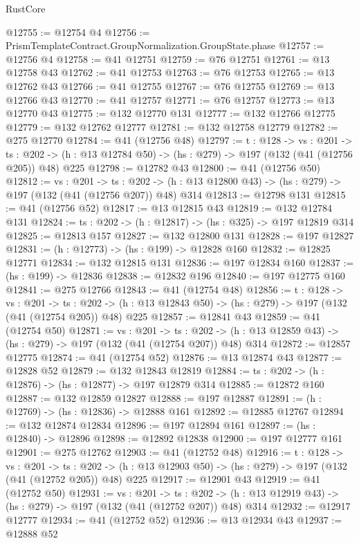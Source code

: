 \begin{lexlean}{RustCore}
\begin{coremodule}
@12755 := @12754 @4
@12756 := PrismTemplateContract.GroupNormalization.GroupState.phase
@12757 := @12756 @4
@12758 := @41 @12751
@12759 := @76 @12751
@12761 := @13 @12758 @43
@12762 := @41 @12753
@12763 := @76 @12753
@12765 := @13 @12762 @43
@12766 := @41 @12755
@12767 := @76 @12755
@12769 := @13 @12766 @43
@12770 := @41 @12757
@12771 := @76 @12757
@12773 := @13 @12770 @43
@12775 := @132 @12770 @131
@12777 := @132 @12766 @12775
@12779 := @132 @12762 @12777
@12781 := @132 @12758 @12779
@12782 := @275 @12770
@12784 := @41 (@12756 @48)
@12797 := {t : @128} ->
  {vs : @201} ->
  {ts : @202} -> (h : @13 @12784 @50) -> (hs : @279) -> @197 (@132 (@41 (@12756 @205)) @48) @225
@12798 := @12782 @43
@12800 := @41 (@12756 @50)
@12812 := {vs : @201} ->
  {ts : @202} -> (h : @13 @12800 @43) -> (hs : @279) -> @197 (@132 (@41 (@12756 @207)) @48) @314
@12813 := @12798 @131
@12815 := @41 (@12756 @52)
@12817 := @13 @12815 @43
@12819 := @132 @12784 @131
@12824 := {ts : @202} -> (h : @12817) -> (hs : @325) -> @197 @12819 @314
@12825 := @12813 @157
@12827 := @132 @12800 @131
@12828 := @197 @12827
@12831 := (h : @12773) -> (hs : @199) -> @12828 @160
@12832 := @12825 @12771
@12834 := @132 @12815 @131
@12836 := @197 @12834 @160
@12837 := (hs : @199) -> @12836
@12838 := @12832 @196
@12840 := @197 @12775 @160
@12841 := @275 @12766
@12843 := @41 (@12754 @48)
@12856 := {t : @128} ->
  {vs : @201} ->
  {ts : @202} -> (h : @13 @12843 @50) -> (hs : @279) -> @197 (@132 (@41 (@12754 @205)) @48) @225
@12857 := @12841 @43
@12859 := @41 (@12754 @50)
@12871 := {vs : @201} ->
  {ts : @202} -> (h : @13 @12859 @43) -> (hs : @279) -> @197 (@132 (@41 (@12754 @207)) @48) @314
@12872 := @12857 @12775
@12874 := @41 (@12754 @52)
@12876 := @13 @12874 @43
@12877 := @12828 @52
@12879 := @132 @12843 @12819
@12884 := {ts : @202} -> (h : @12876) -> (hs : @12877) -> @197 @12879 @314
@12885 := @12872 @160
@12887 := @132 @12859 @12827
@12888 := @197 @12887
@12891 := (h : @12769) -> (hs : @12836) -> @12888 @161
@12892 := @12885 @12767
@12894 := @132 @12874 @12834
@12896 := @197 @12894 @161
@12897 := (hs : @12840) -> @12896
@12898 := @12892 @12838
@12900 := @197 @12777 @161
@12901 := @275 @12762
@12903 := @41 (@12752 @48)
@12916 := {t : @128} ->
  {vs : @201} ->
  {ts : @202} -> (h : @13 @12903 @50) -> (hs : @279) -> @197 (@132 (@41 (@12752 @205)) @48) @225
@12917 := @12901 @43
@12919 := @41 (@12752 @50)
@12931 := {vs : @201} ->
  {ts : @202} -> (h : @13 @12919 @43) -> (hs : @279) -> @197 (@132 (@41 (@12752 @207)) @48) @314
@12932 := @12917 @12777
@12934 := @41 (@12752 @52)
@12936 := @13 @12934 @43
@12937 := @12888 @52

\end{coremodule}
\end{lexlean}
